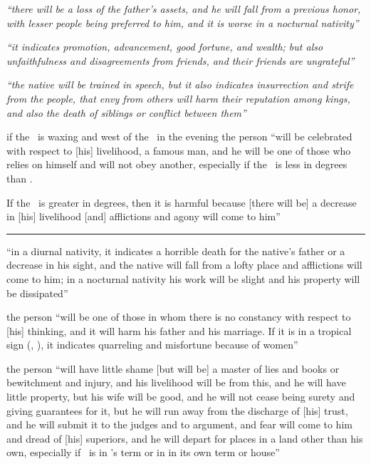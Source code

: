 \begin{description}[style=multiline,leftmargin=1.5cm]
\item[\Jupiter\Opposition\Sun] \textsl{``there will be a loss of the father's assets, and he will fall from a previous honor, with lesser people being preferred to him, and it is worse in a nocturnal nativity''}

\item[\Jupiter\Opposition\Venus] \textsl{``it indicates promotion, advancement, good fortune, and wealth; but also unfaithfulness and disagreements from friends, and their friends are ungrateful''}

\item[\Jupiter\Opposition\Mercury] \textsl{``the native will be trained in speech, but it also indicates insurrection and strife from the people, that envy from others will harm their reputation among kings, and also the death of siblings or conflict between them''}

\item[\Jupiter\Opposition\Moon] if the \Moon\, is waxing and west of the \Sun\, in the evening the person ``will be celebrated with respect to [his] livelihood, a famous man, and he will be one of those who relies on himself and will not obey another, especially if the \Moon\, is less in degrees than \Jupiter. 

If the \Moon\, is greater in degrees, then it is harmful because [there will be] a decrease in [his] livelihood [and] afflictions and agony will come to him''

\vspace{0.5em}\hrule
\item[\Mars\Opposition\Sun] ``in a diurnal nativity, it indicates a horrible death for the native's father or a decrease in his sight, and the native will fall from a lofty place and afflictions will come to him; in a nocturnal nativity his work will be slight and his property will be dissipated''

\item[\Mars\Opposition\Venus] the person ``will be one of those in whom there is no constancy with respect to [his] thinking, and it will harm his father and his marriage. If it is in a tropical sign (\Cancer, \Capricorn), it indicates quarreling and misfortune because of women''

\item[\Mars\Opposition\Mercury] the person ``will have little shame [but will be] a master of lies and books or bewitchment and injury, and his livelihood will be from this, and he will have little property, but his wife will be good, and he will not cease being surety and giving guarantees for it, but he will run away from the discharge of [his] trust, and he will submit it to the judges and to argument, and fear will come to him and dread of [his] superiors, and he will depart for places in a land other than his own, especially if \Mercury\, is in \Saturn's term or in in its own term or house''


\end{description}
